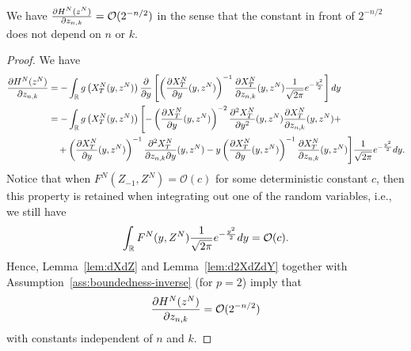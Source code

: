 \begin{proposition}
  \label{prop:first-derivatives}
  We have $\frac{\partial H^N(z^N)}{\partial z_{n,k}} = \mathcal{O}(2^{-n/2})$ in the sense
  that the constant in front of $2^{-n/2}$ does not depend on $n$ or $k$.
\end{proposition}
\begin{proof}
  We have
  \begin{align*}
    \frac{\partial H^N(z^N)}{\partial z_{n,k}} &= -\int_{\mathbb{R}} g\left( X^N_T
      (y, z^N) \right) \frac{\partial}{\partial y} \left[ \left( \frac{\partial X^N_T}{\partial y}(y, z^N)
  \right)^{-1} \frac{\partial X^N_T}{\partial z_{n,k}}(y, z^N)  \frac{1}{\sqrt{2\pi}}
                                    e^{-\frac{y^2}{2}} \right] dy\\
    &= -\int_{\mathbb{R}} g\left( X^N_T(y, z^N) \right) \Biggl[- \left( \frac{\partial
      X^N_T}{\partial y}(y, z^N) \right)^{-2} \frac{\partial^2 X^N_T}{\partial y^2}(y, z^N)
      \frac{\partial X^N_T}{\partial z_{n,k}}(y, z^N) +\\
    &\quad+ \left( \frac{\partial X^N_T}{\partial y}(y, z^N) \right)^{-1} \frac{\partial^2
      X^N_T}{\partial z_{n,k} \partial y}(y, z^N) - y \left( \frac{\partial X^N_T}{\partial y}(y, z^N)
  \right)^{-1} \frac{\partial X^N_T}{\partial z_{n,k}}(y, z^N) \Biggr] \frac{1}{\sqrt{2\pi}}
                                    e^{-\frac{y^2}{2}}dy.
  \end{align*}
  Notice that when $F^N(Z_{-1}, Z^N) = \mathcal{O}(c)$ for some deterministic
  constant $c$, then this property is retained when integrating out one of the
  random variables, i.e., we still have
  \begin{equation*}
    \int_{\mathbb{R}} F^N(y, Z^N) \frac{1}{\sqrt{2\pi}} e^{-\frac{y^2}{2}}dy = \mathcal{O}(c).
  \end{equation*}
  Hence, Lemma~\ref{lem:dXdZ} and Lemma~\ref{lem:d2XdZdY} together with
  Assumption~\ref{ass:boundedness-inverse} (for $p=2$) imply that
  \begin{equation*}
    \frac{\partial H^N(z^N)}{\partial z_{n,k}} = \mathcal{O}(2^{-n/2})
  \end{equation*}
  with constants independent of $n$ and $k$.
\end{proof}

